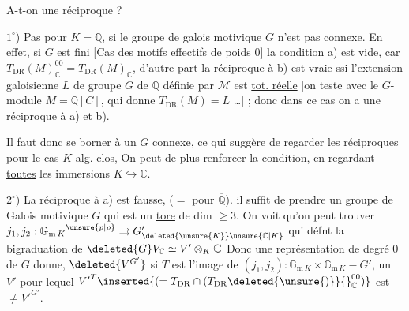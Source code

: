 A-t-on une réciproque ?

$1^\circ$) Pas pour  $K=\mathbb Q$, si le groupe de galois motivique $G$  n'est pas connexe. En effet, si $G$ est  fini [Cas des motifs effectifs de poids 0] la condition a) est vide, car $T_{\mathrm{DR}}(M)_{\mathbb C}^{00}=T_{\mathrm{DR}}(M)_{\mathbb C}$,  d'autre part  la réciproque à b) est vraie ssi l'extension galoisienne $L$ de groupe $G$ de $\mathbb Q$ définie par $\mathcal M$ est \uline{tot. réelle} [on teste avec le $G$-module $M=\mathbb Q[C]$, qui donne $T_{\mathrm{DR}}(M)=L$ \ldots] ; donc dans ce cas on a une réciproque à a) et b).

Il faut donc se borner à un $G$ connexe, ce qui suggère de regarder les réciproques pour le cas $K$ alg. clos,  On peut de plus renforcer la condition, en regardant \uline{toutes} les immersions $K\hookrightarrow\mathbb C$.

$2^\circ$) La réciproque à a) est fausse,  ($=$ pour $\overline{\mathbb Q}$). il suffit de prendre un groupe de Galois motivique $G$ qui est un \uline{tore} de dim $\geq 3$. On voit qu'on peut trouver 
$j_1,j_2:{\mathbb G_{\mathrm m\,K}}^{\unsure{p|\rho}}\rightrightarrows G'_{\deleted{\unsure{K}}\unsure{\mathbb C|K}}$ qui défnt  la bigraduation de
$\deleted{G}V_{\mathbb C}\simeq V'\otimes_K\mathbb C$ \quad [$V'=P\mathbin{\overset{G_K}{\deleted{\unsure{\times}}}}V$, $P\unsure{\simeq|=}\underline{\operatorname{Isom}}_{\otimes}(T_{\mathrm B}\otimes K,T_{\mathrm{DR}})$]
Donc une représentation  de degré 0 de $G$ donne, $\deleted{V^{G'}}$ si $T$ est l'image de $(j_1,j_2):\mathbb G_{\mathrm m\,K}\times\mathbb G_{\mathrm m\,K}\mathbin{-}G'$, un $V'$ pour lequel
${V'}^{T}\inserted{(=T_{\mathrm{DR}}\cap(T_{\mathrm{DR}}\deleted{\unsure{)}}{}_{\mathbb C}^{00})}$
 est $\ne {V'}^{G'}$.



